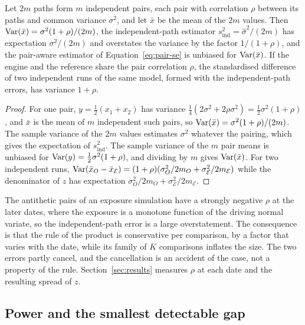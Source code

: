 \begin{proposition}\label{prop:antithetic}
Let $2m$ paths form $m$ independent pairs, each pair with correlation $\rho$ between its paths and common variance $\sigma^2$, and let $\bar{x}$ be the mean of the $2m$ values. Then $\operatorname{Var}(\bar{x})=\sigma^{2}(1+\rho)/(2m)$, the independent-path estimator $s_{\mathrm{ind}}^2=\hat\sigma^2/(2m)$ has expectation $\sigma^2/(2m)$ and overstates the variance by the factor $1/(1+\rho)$, and the pair-aware estimator of Equation~\eqref{eq:pair-se} is unbiased for $\operatorname{Var}(\bar{x})$. If the engine and the reference share the pair correlation $\rho$, the standardised difference of two independent runs of the same model, formed with the independent-path errors, has variance $1+\rho$.
\end{proposition}
\begin{proof}
For one pair, $y=\tfrac12(x_1+x_2)$ has variance $\tfrac14(2\sigma^2+2\rho\sigma^2)=\tfrac12\sigma^2(1+\rho)$, and $\bar{x}$ is the mean of $m$ independent such pairs, so $\operatorname{Var}(\bar{x})=\sigma^2(1+\rho)/(2m)$. The sample variance of the $2m$ values estimates $\sigma^2$ whatever the pairing, which gives the expectation of $s_{\mathrm{ind}}^2$. The sample variance of the $m$ pair means is unbiased for $\operatorname{Var}(y)=\tfrac12\sigma^2(1+\rho)$, and dividing by $m$ gives $\operatorname{Var}(\bar{x})$. For two independent runs, $\operatorname{Var}(\bar{x}_O-\bar{x}_{\mathcal{E}})=(1+\rho)(\sigma_O^2/2m_O+\sigma_{\mathcal{E}}^2/2m_{\mathcal{E}})$ while the denominator of $z$ has expectation $\sigma_O^2/2m_O+\sigma_{\mathcal{E}}^2/2m_{\mathcal{E}}$. \qedhere
\end{proof}

The antithetic pairs of an exposure simulation have a strongly negative $\rho$ at the later dates, where the exposure is a monotone function of the driving normal variate, so the independent-path error is a large overstatement. The consequence is that the rule of the product is conservative per comparison, by a factor that varies with the date, while its family of $K$ comparisons inflates the size. The two errors partly cancel, and the cancellation is an accident of the case, not a property of the rule. Section~\ref{sec:results} measures $\rho$ at each date and the resulting spread of $z$.

\subsection{Power and the smallest detectable gap}
\label{sec:theory-power}


